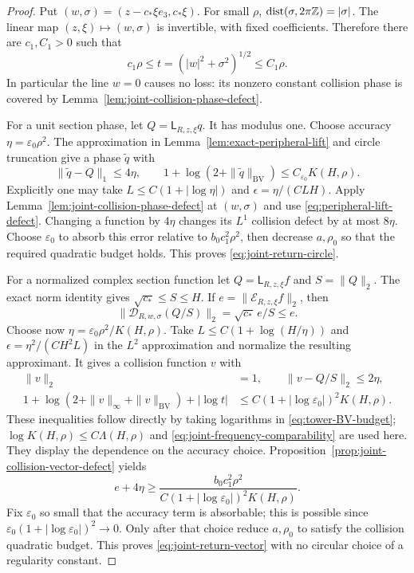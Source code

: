 \begin{proof}
Put $(w,\sigma)=(z-c_*\xi e_3,c_*\xi)$. For small $\rho$,
$\operatorname{dist}(\sigma,2\pi\mathbb Z)=|\sigma|$. The linear map
$(z,\xi)\mapsto(w,\sigma)$ is invertible, with fixed coefficients.
Therefore there are $c_1,C_1>0$ such that
\begin{equation}\label{eq:joint-frequency-comparability}
 c_1\rho\le t=(|w|^2+\sigma^2)^{1/2}\le C_1\rho.
\end{equation}
In particular the line $w=0$ causes no loss: its nonzero constant
collision phase is covered by
Lemma~\ref{lem:joint-collision-phase-defect}.

For a unit section phase, let $Q=\mathsf L_{R,z,\xi}q$.
It has modulus one. Choose accuracy $\eta=\varepsilon_0\rho^2$.
The approximation in Lemma~\ref{lem:exact-peripheral-lift} and
circle truncation give a phase $\widetilde q$ with
\[
 \|\widetilde q-Q\|_1\le4\eta,\qquad
 1+\log(2+\|\widetilde q\|_{\mathrm{BV}})
                           \le C_{\varepsilon_0}K(H,\rho).
\]
Explicitly one may take $L\le C(1+|\log\eta|)$ and
$\epsilon=\eta/(CLH)$. Apply
Lemma~\ref{lem:joint-collision-phase-defect} at $(w,\sigma)$ and
use \eqref{eq:peripheral-lift-defect}. Changing a function by
$4\eta$ changes its $L^1$ collision defect by at most $8\eta$.
Choose $\varepsilon_0$ to absorb this error relative to $b_0c_1^2\rho^2$,
then decrease $a,\rho_0$ so that the required quadratic budget holds.
This proves \eqref{eq:joint-return-circle}.

For a normalized complex section function let
$Q=\mathsf L_{R,z,\xi}f$ and $S=\|Q\|_2$. The exact norm identity
gives $\sqrt{c_*}\le S\le H$. If
$e=\|\mathcal E_{R,z,\xi}f\|_2$, then
\[
 \|\mathcal D_{R,w,\sigma}(Q/S)\|_2
                        =\sqrt{c_*}\,e/S\le e.
\]
Choose now $\eta=\varepsilon_0\rho^2/K(H,\rho)$.
Take $L\le C(1+\log(H/\eta))$ and
$\epsilon=\eta^2/(CH^2L)$ in the $L^2$ approximation and normalize
the resulting approximant. It gives a collision function $v$ with
\begin{align*}
 \|v\|_2&=1,\qquad \|v-Q/S\|_2\le2\eta,\\
 1+\log(2+\|v\|_\infty+\|v\|_{\mathrm{BV}})+|\log t|
       &\le C(1+|\log\varepsilon_0|)^2K(H,\rho).
\end{align*}
These inequalities follow directly by taking logarithms in
\eqref{eq:tower-BV-budget};
$\log K(H,\rho)\le C\Lambda(H,\rho)$ and
\eqref{eq:joint-frequency-comparability} are used here.
They display the dependence on the accuracy choice.
Proposition~\ref{prop:joint-collision-vector-defect} yields
\[
 e+4\eta\ge
 \frac{b_0c_1^2\rho^2}
      {C(1+|\log\varepsilon_0|)^2K(H,\rho)}.
\]
Fix $\varepsilon_0$ so small that the accuracy term is absorbable;
this is possible since
$\varepsilon_0(1+|\log\varepsilon_0|)^2\to0$.
Only after that choice reduce $a,\rho_0$ to satisfy the collision
quadratic budget. This proves \eqref{eq:joint-return-vector} with
no circular choice of a regularity constant.
\end{proof}

